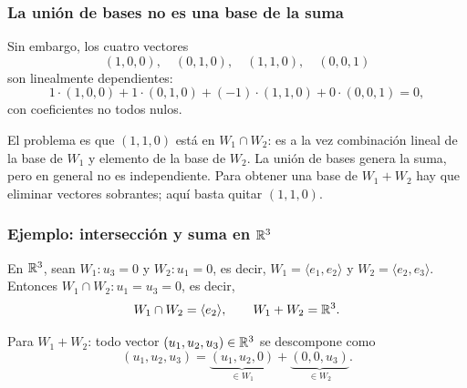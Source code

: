 \begin{frame}
    \frametitle{La unión de bases no es una base de la suma}

    Sin embargo, los cuatro vectores
    \[
        (1,0,0),\quad(0,1,0),\quad(1,1,0),\quad(0,0,1)
    \]
    son linealmente dependientes:
    \[
        1\cdot(1,0,0)+1\cdot(0,1,0)+(-1)\cdot(1,1,0)+0\cdot(0,0,1)=0,
    \]
    con coeficientes no todos nulos.

    \medskip

    El problema es que $(1,1,0)$ está en $W_1\cap W_2$: es a la vez
    combinación lineal de la base de $W_1$ y elemento de la base de $W_2$.
    La unión de bases genera la suma, pero en general
    \alert{no es independiente}. Para obtener una base de $W_1+W_2$ hay que
    eliminar vectores sobrantes; aquí basta quitar $(1,1,0)$.
\end{frame}


\begin{frame}
    \frametitle{Ejemplo: intersección y suma en $\mathbb{R}^3$}

    \begin{example}
        En $\mathbb{R}^3$, sean $W_1\colon u_3=0$ y $W_2\colon u_1=0$, es decir,
        $W_1=\langle e_1,e_2\rangle$ y $W_2=\langle e_2,e_3\rangle$. Entonces
        $W_1\cap W_2\colon u_1=u_3=0$, es decir,
        \[
            W_1\cap W_2=\langle e_2\rangle,
            \qquad
            W_1+W_2=\mathbb{R}^3.
        \]
    \end{example}

    Para $W_1+W_2$: todo vector $(u_1,u_2,u_3)\in\mathbb{R}^3$ se descompone como
    \[
        (u_1,u_2,u_3)=\underbrace{(u_1,u_2,0)}_{\in W_1}
        +\underbrace{(0,0,u_3)}_{\in W_2}.
    \]
\end{frame}


